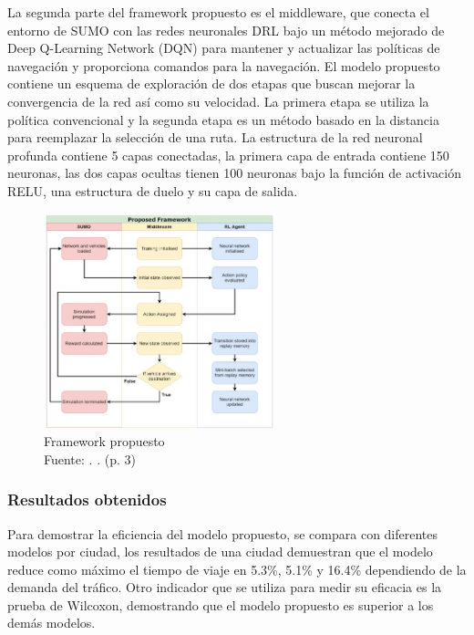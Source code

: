 La segunda parte del framework propuesto es el middleware, que conecta el entorno de SUMO con las redes neuronales DRL bajo un método mejorado de Deep Q-Learning Network (DQN) para mantener y actualizar las políticas de navegación y proporciona comandos para la navegación. El modelo propuesto contiene un esquema de exploración de dos etapas que buscan mejorar la convergencia de la red así como su velocidad. La primera etapa se utiliza la política convencional y la segunda etapa es un método basado en la distancia para reemplazar la selección de una ruta. La estructura de la red neuronal profunda contiene 5 capas conectadas, la primera capa de entrada contiene 150 neuronas, las dos capas ocultas tienen 100 neuronas bajo la función de activación RELU, una estructura de duelo y su capa de salida. %

\begin{figure}[h]
	\begin{center}
		\includegraphics[width=0.6\textwidth]{2/figures/SUMO.jpg}
		\caption[Framework propuesto]{Framework propuesto\\
			Fuente: \cite{pr_koh}. . (p. 3)}
		\label{1:fig2}
	\end{center}
\end{figure}

\subsubsection{Resultados obtenidos}
Para demostrar la eficiencia del modelo propuesto, se compara con diferentes modelos por ciudad, los resultados de una ciudad demuestran que el modelo reduce como máximo el tiempo de viaje en 5.3\%, 5.1\% y 16.4\% dependiendo de la demanda del tráfico. Otro indicador que se utiliza para medir su eficacia es la prueba de Wilcoxon, demostrando que el modelo propuesto es superior a los demás modelos.%

